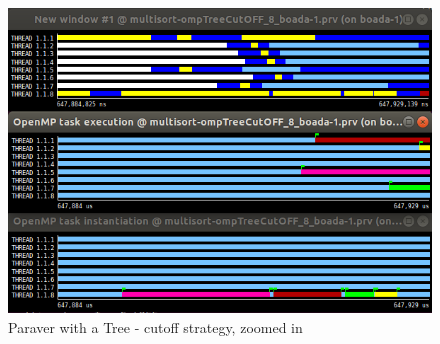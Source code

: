 \documentclass[12]{article}
\begin{document}
\medskip
\begin{figure}[H]
    \centering
    \includegraphics[scale=0.75]{images/paraverTreeCutoffZoom.PNG}
    \caption{Paraver with a Tree - cutoff strategy, zoomed in}
    \label{paravercutoffZoom}
\end{figure}
\end{document}
